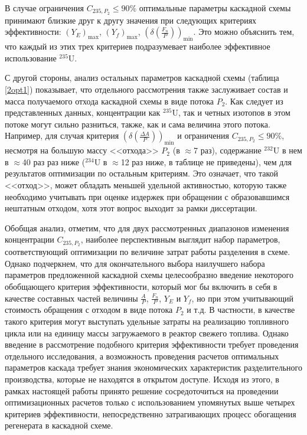 В случае ограничения $C_{235,{P_2}} \leq 90\%$ оптимальные параметры каскадной схемы принимают близкие друг к другу значения при следующих критериях эффективности: $(Y_{E})_\text{max}$, $(Y_f)_\text{max}$, $(\delta(\frac{F_n}{P}))_\text{min}$. Это можно объяснить тем, что каждый из этих трех критериев подразумевает наиболее эффективное использование $^{235}$U.

С другой стороны, анализ остальных параметров каскадной схемы (таблица \ref{2opt1}) показывает, что отдельного рассмотрения также заслуживает состав и масса получаемого отхода каскадной схемы в виде потока $P_2$. Как следует из представленных данных, концентрации как $^{235}$U, так и четных изотопов в этом потоке могут сильно разниться, также, как и сама величина этого потока. Например, для случая критерия $(\delta(\frac{\Delta A}{P}))_\text{min}$ и ограничения $C_{235,{P_2}} \leq 90\%$, несмотря на большую массу <<отхода>> $P_{2}$ (в $\approx$7 раз), содержание $^{232}$U в нем в $\approx$40 раз раз ниже ($^{234}$U в $\approx$12 раз ниже, в таблице не приведены), чем для результатов оптимизации по остальным критериям. Это означает, что такой <<отход>>, может обладать меньшей удельной активностью, которую также необходимо учитывать при оценке издержек при обращении с образовавшимся нештатным отходом, хотя этот вопрос выходит за рамки диссертации. 

Обобщая анализ, отметим, что для двух рассмотренных диапазонов изменения концентрации $C_{235,{P_2}}$, наиболее перспективным выглядит набор параметров, соответствующий оптимизации по величине затрат работы разделения в схеме. Однако подчеркнем, что для окончательного выбора наилучшего набора параметров предложенной каскадной схемы целесообразно введение некоторого обобщающего критерия эффективности, который мог бы включить в себя в качестве составных частей величины $\frac{A}{P}$, $\frac{F_n}{P}$, $Y_E$ и $Y_f$, но при этом учитывающий стоимость обращения с отходом в виде потока $P_2$ и т.д. В частности, в качестве такого критерия могут выступать удельные затраты на реализацию топливного цикла или на единицу массы загружаемого в реактор свежего топлива. Однако введение в рассмотрение подобного критерия эффективности требует проведения отдельного исследования, а возможность проведения расчетов оптимальных параметров каскада требует знания экономических характеристик разделительного производства, которые не находятся в открытом доступе. Исходя из этого, в рамках настоящей работы принято решение сосредоточиться на проведении оптимизационных расчетов только с использованием упомянутых выше четырех критериев эффективности, непосредственно затрагивающих процесс обогащения регенерата в каскадной схеме.

